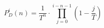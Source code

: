 \documentclass{standalone}
\begin{document}
\centering
\begin{minipage}{5cm}
	\[
		P_D^i(n)
		=
		\frac{1}{T^n}
		\cdot
		\prod_{j=0}^{i - n - 1}
		\left(1 - \frac{j}{T}\right)
	\]
\end{minipage}
\end{document}
